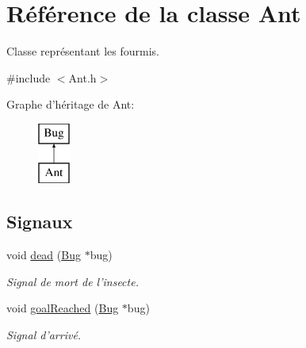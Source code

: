 \hypertarget{classAnt}{
\section{Référence de la classe Ant}
\label{classAnt}
}


Classe représentant les fourmis.  




{\ttfamily \#include $<$Ant.h$>$}

Graphe d'héritage de Ant:\begin{figure}[H]
\begin{center}
\leavevmode
\includegraphics[height=2.000000cm]{classAnt}
\end{center}
\end{figure}
\subsection*{Signaux}
\begin{DoxyCompactItemize}
\item 
void \hyperlink{classBug_ab7379f5a0172e2d536e20f3f29915e02}{dead} (\hyperlink{classBug}{Bug} $\ast$bug)
\begin{DoxyCompactList}\small\item\em Signal de mort de l'insecte. \end{DoxyCompactList}\item 
void \hyperlink{classBug_a33f90dffa55e1dce80dc2416c75a53c8}{goalReached} (\hyperlink{classBug}{Bug} $\ast$bug)
\begin{DoxyCompactList}\small\item\em Signal d'arrivé. \end{DoxyCompactList}\end{DoxyCompactItemize}
